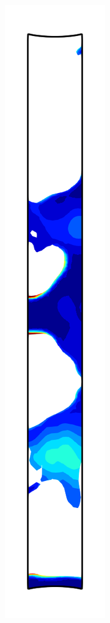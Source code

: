 \begin{figure}[!htb]
\begin{subfigure}{0.08\textwidth}
  \end{subfigure}
  \begin{subfigure}{0.08\textwidth}
    \centering
    \includegraphics[width=\textwidth]{Chapter5/figures/spallation/psii_5}

\end{subfigure}
\end{figure}
